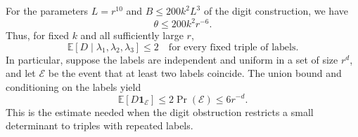 For the parameters $L=r^{10}$ and $B\leq200k^2L^3$ of the digit
construction, we have
\[
 \theta\leq200k^2r^{-6}.
\]
Thus, for fixed $k$ and all sufficiently large $r$,
\begin{equation}
 \mathbb E[D\mid\lambda_1,\lambda_2,\lambda_3]\leq2
 \quad\text{for every fixed triple of labels.}
 \label{orb:uniform-moment}
\end{equation}
In particular, suppose the labels are independent and uniform in a set
of size $r^d$, and let $\mathcal E$ be the event that at least two labels
coincide.  The union bound and conditioning on the labels yield
\begin{equation}
 \mathbb E[D\mathbf1_{\mathcal E}]
 \leq2\Pr(\mathcal E)\leq6r^{-d}.
 \label{orb:collision-moment}
\end{equation}
This is the estimate needed when the digit obstruction restricts a
small determinant to triples with repeated labels.
